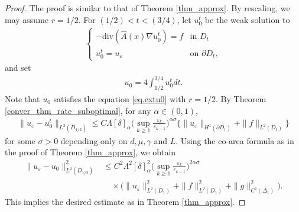 \documentclass[reqno,12pt]{amsart} %
\theoremstyle{definition}
\theoremstyle{remark}
\numberwithin{equation}{section}
\newcommand{\e}{\varepsilon}
\begin{document}
\begin{proof}
    The proof is similar to that of Theorem \ref{thm_approx}.
  By rescaling, we may assume $r=1/2$.   For $(1/2)<t<(3/4)$, let $u_0^t$ be the weak solution to
\begin{align*}
  \begin{cases}
    -\mathrm{div}(\widehat{A}(x)\nabla u_0^t)=f &\text{in }D_t\\
    u_0^t=u_\varepsilon&\text{on }\partial D_t,
  \end{cases}
\end{align*}
and set
\begin{align*}
  u_0=4\int_{1/2}^{3/4} u_0^tdt. 
\end{align*}
Note that $u_0$ satisfies the equation \eqref{eq.extu0} with $r = 1/2$. By Theorem \ref{conver_thm_rate_suboptimal}, for any $\alpha \in (0,1)$,
\begin{align*}
  \|u_\varepsilon-u_0^t\|_{L^2(D_{1/2})}\leq C\Lambda [\delta]_\alpha\Big(\sup_{k\geq 1} \frac{\e_k}{\e_{k-1}}\Big)^{\alpha\sigma}\{\|u_\varepsilon\|_{H^{1}(\partial D_t)}+\|f\|_{L^2(D_t)}\}
\end{align*}
for some $\sigma>0$ depending only on $d, \mu, \gamma $ and $L$. 
Using the co-area formula as in the proof of Theorem \ref{thm_approx}, we obtain
\begin{align*}
  \|u_\varepsilon-u_0\|_{L^2(D_{1/2})}^2
  &\le C^2\Lambda^2 [\delta]_\alpha^2 \Big(\sup_{k\geq 1} \frac{\e_k}{\e_{k-1}}\Big)^{2\alpha\sigma}\\&\quad\times\Big(\|u_\varepsilon\|_{L^2(D_{1})}^2+\|f\|_{L^2(D_{1})}^2+\|g\|_{C^1(\Delta_1)}^2\Big).
\end{align*}
This implies the desired estimate as in Theorem \ref{thm_approx}. 
\end{proof}
\end{document}
